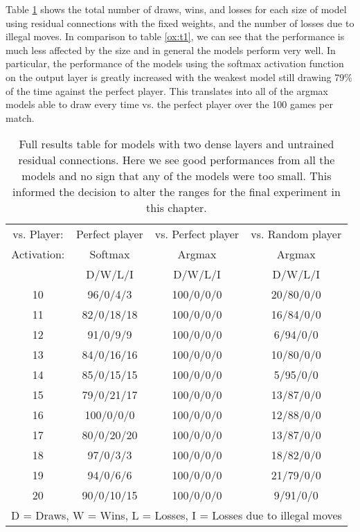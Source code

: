 \documentclass{somasmsc}
\begin{document}
\begin{exa}
Table \ref{ox:t2} shows the total number of draws, wins, and losses for each size of model using residual connections with the fixed weights, and the number of losses due to illegal moves. In comparison to table \ref{ox:t1}, we can see that the performance is much less affected by the size and in general the models perform very well. In particular, the performance of the models using the softmax activation function on the output layer is greatly increased with the weakest model still drawing 79\% of the time against the perfect player. This translates into all of the argmax models able to draw every time vs. the perfect player over the 100 games per match.

\begin{table}[h!]
\centering
\begin{tabular}{ |c|c|c|c| }
 \hline
  vs. Player: & Perfect player & vs. Perfect player & vs. Random player \\
  Activation: & Softmax & Argmax & Argmax \\
  & D/W/L/I & D/W/L/I & D/W/L/I \\
 \hline
 10 & 96/0/4/3   & 100/0/0/0 & 20/80/0/0 \\
 11 & 82/0/18/18 & 100/0/0/0 & 16/84/0/0 \\
 12 & 91/0/9/9   & 100/0/0/0 & 6/94/0/0  \\
 13 & 84/0/16/16 & 100/0/0/0 & 10/80/0/0 \\
 14 & 85/0/15/15 & 100/0/0/0 & 5/95/0/0  \\
 15 & 79/0/21/17 & 100/0/0/0 & 13/87/0/0 \\
 16 & 100/0/0/0  & 100/0/0/0 & 12/88/0/0 \\
 17 & 80/0/20/20 & 100/0/0/0 & 13/87/0/0 \\
 18 & 97/0/3/3   & 100/0/0/0 & 18/82/0/0 \\
 19 & 94/0/6/6   & 100/0/0/0 & 21/79/0/0 \\
 20 & 90/0/10/15 & 100/0/0/0 & 9/91/0/0  \\
 \hline
 \multicolumn{4}{|c|}{D = Draws, W = Wins, L = Losses, I = Losses due to illegal moves} \\
 \hline
\end{tabular}
\caption{Full results table for models with two dense layers and untrained residual connections. Here we see good performances from all the models and no sign that any of the models were too small. This informed the decision to alter the ranges for the final experiment in this chapter.}
\label{ox:t2}
\end{table}


\end{exa}
\end{document}
